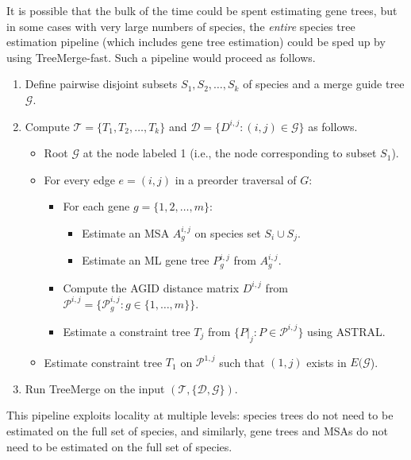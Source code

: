 It is possible that the bulk of the time could be spent estimating gene trees, but in some cases with very large numbers of species, the {\em entire} species tree estimation pipeline (which includes gene tree estimation) could be sped up by using TreeMerge-fast.
Such a pipeline would proceed as follows.
\begin{enumerate}
	\item Define pairwise disjoint subsets $S_1, S_2, \dots, S_k$ of species and a merge guide tree $\mathcal{G}$.
	\item Compute $\mathcal{T} = \{T_1, T_2, \dots, T_k\}$ and $\mathcal{D} = \{ D^{i,j} : (i,j) \in \mathcal{G} \}$ as follows.
	\begin{itemize}
		\item Root $\mathcal{G}$ at the node labeled 1 (i.e., the node corresponding to subset $S_1$). 
		\item For every edge $e = (i,j)$ in a preorder traversal of ${G}$:
		\begin{itemize}
			\item For each gene $g = \{1, 2, \dots, m\}$:
				\begin{itemize}
				\item Estimate an \gls{MSA} $A_g^{i,j}$ on species set $S_i \cup S_j$.
				\item Estimate an \gls{ML} gene tree $P_g^{i,j}$ from $A_g^{i,j}$.
				\end{itemize}
		\end{itemize}
		\begin{itemize}
		\item Compute the AGID distance matrix $D^{i,j}$ from $\mathcal{P}^{i,j} =  \{ \mathcal{P}_g^{i,j} : g \in \{1, \dots, m\}\}$.
		\item Estimate a constraint tree $T_j$ from $\{ P|_j : P \in \mathcal{P}^{i,j} \}$ using ASTRAL.
		\end{itemize}
		\item Estimate constraint tree $T_1$ on $\mathcal{P}^{1,j}$ such that $(1,j)$ exists in $E(\mathcal{G}$).
		\end{itemize}
	\item Run TreeMerge on the input $(\mathcal{T}, \{\mathcal{D}, \mathcal{G} \})$.
\end{enumerate}
This pipeline exploits locality at multiple levels: species trees do not need to be estimated on the full set of species, and similarly, gene trees and MSAs do not need to be estimated on the full set of species.

